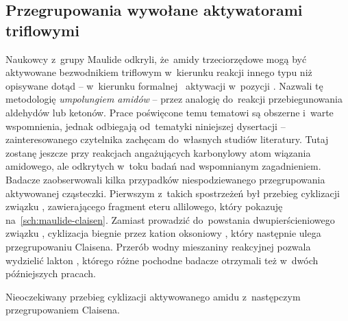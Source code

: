 \subsection{Przegrupowania wywołane aktywatorami triflowymi}\label{literature:triflic:rearangements}

Naukowcy z~grupy Maulide odkryli, że~amidy trzeciorzędowe mogą być aktywowane bezwodnikiem
  triflowym w~kierunku reakcji innego typu niż opisywane dotąd \--- w~kierunku formalnej
  ~aktywacji w~pozycji \textalpha{}.
Nazwali tę metodologię \emph{umpolungiem amidów} \--- przez analogię do~reakcji
  przebiegunowania aldehydów lub ketonów.
Prace poświęcone temu tematowi są obszerne i~warte wspomnienia, jednak odbiegają od~tematyki
  niniejszej dysertacji \--- zainteresowanego czytelnika zachęcam do~własnych studiów literatury.
Tutaj zostanę jeszcze przy reakcjach angażujących karbonylowy atom wiązania amidowego,
  ale odkrytych w~toku badań nad wspomnianym zagadnieniem.
Badacze zaobserwowali kilka przypadków niespodziewanego przegrupowania aktywowanej cząsteczki.
Pierwszym z~takich spostrzeżeń był przebieg cyklizacji związku ,
  zawierającego fragment eteru allilowego, który pokazuję na~\cref{sch:maulide-claisen}.
Zamiast prowadzić do~powstania dwupierścieniowego związku ,
  cyklizacja biegnie przez kation oksoniowy ,
  który następnie ulega przegrupowaniu Claisena.
Przerób wodny mieszaniny reakcyjnej pozwala wydzielić lakton ,
  którego różne pochodne badacze otrzymali też w~dwóch późniejszych pracach.
\begin{scheme*}
  \centering
  
  \caption{
    Nieoczekiwany przebieg cyklizacji aktywowanego amidu 
      z~następczym przegrupowaniem Claisena.
  }
  \label{sch:maulide-claisen}
\end{scheme*}

